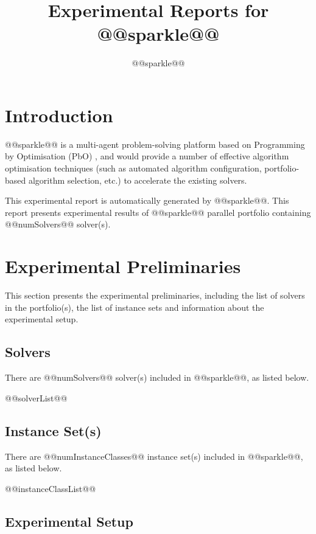 \documentclass[british]{article}
\title{Experimental Reports for @@sparkle@@ }
\author{ @@sparkle@@ }
\begin{document}
\maketitle %


\section{Introduction}
\label{sec:Introduction}

@@sparkle@@ \cite{Hoos15} is a multi-agent problem-solving platform based on Programming by Optimisation (PbO) \cite{Hoos12}, and would provide a number of effective algorithm optimisation techniques (such as automated algorithm configuration, portfolio-based algorithm selection, etc.) to accelerate the existing solvers.

This experimental report is automatically generated by @@sparkle@@. This report presents experimental results of @@sparkle@@ parallel portfolio containing @@numSolvers@@ solver(s).

\section{Experimental Preliminaries}
\label{sec:Experimental_Preliminaries}

This section presents the experimental preliminaries, including the list of solvers in the portfolio(s), the list of instance sets and information about the experimental setup.

\subsection{Solvers}
\label{sec:Solvers}
There are @@numSolvers@@ solver(s) included in @@sparkle@@, as listed below.

\begin{enumerate} 
@@solverList@@
\end{enumerate}

\subsection{Instance Set(s)}
\label{sec:Instance_Sets}
There are @@numInstanceClasses@@ instance set(s) included in @@sparkle@@, as listed below.

\begin{enumerate}
@@instanceClassList@@
\end{enumerate}

\subsection{Experimental Setup}
\label{sec:Experimental_Setup}
\end{document}

